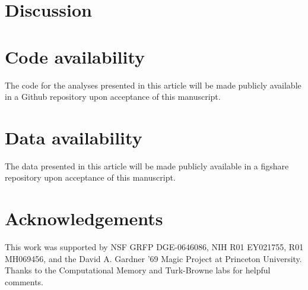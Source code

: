 \documentclass[11pt,letterpaper]{article}
\begin{document}

\section*{Discussion}

\section*{Code availability} The code for the analyses presented in this article will be made publicly available in a Github repository upon acceptance of this manuscript.

\section*{Data availability} The data presented in this article will be made publicly available in a figshare repository upon acceptance of this manuscript.

\section*{Acknowledgements}

This work was supported by NSF GRFP DGE-0646086, NIH R01 EY021755, R01 MH069456, and the David A. Gardner '69 Magic Project at Princeton University. Thanks to the Computational Memory and Turk-Browne labs for helpful comments.
\end{document}
